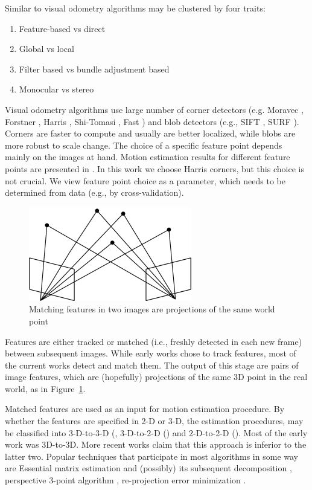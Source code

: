 \documentclass[MSc,beforeExam]{iitcsthesis}
\begin{document}
Similar to \cite{Persson2015} visual odometry algorithms may be
clustered by four traits:
\begin{enumerate}
\item Feature-based vs direct
\item Global vs local
\item Filter based vs bundle adjustment based
\item Monocular vs stereo
\end{enumerate}

Visual odometry algorithms use large number of corner detectors
(e.g. Moravec \cite{Moravec1980}, Forstner \cite{Forstner}, Harris
\cite{Harris1987}, Shi-Tomasi \cite{Shi1994}, Fast \cite{Rosten2006})
and blob detectors (e.g., SIFT \cite{Lowe2004}, SURF
\cite{Bay2006}). Corners are faster to compute and usually are better
localized, while blobs are more robust to scale change. The choice of
a specific feature point depends mainly on the images at hand.  Motion
estimation results for different feature points are presented in
\cite{Govender2009}. In this work we choose Harris \cite{Harris1987}
corners, but this choice is not crucial. We view feature point choice
as a parameter, which needs to be determined from data (e.g., by
cross-validation).

\begin{figure}[h]
  \centering
\includegraphics{5ptm2}
\caption{Matching features in two images are projections of the same
  world point}
\label{fig:5ptm}
\end{figure}

Features are either tracked \cite{Hedborg2009} or matched
\cite{Geiger2011} (i.e., freshly detected in each new frame) between
subsequent images. While early works chose to track features, most of
the current works detect and match them. The output of this stage are
pairs of image features, which are (hopefully) projections of the same
3D point in the real world, as in Figure~\ref{fig:5ptm}.

Matched features are used as an input for motion estimation procedure.
By whether the features are specified in 2-D or 3-D, the estimation
procedures, may be classified into 3-D-to-3-D (\cite{Milella2006},
3-D-to-2-D (\cite{Geiger2011}) and 2-D-to-2-D
(\cite{Nister2004}). Most of the early work was 3D-to-3D.  More recent
works \cite{Nister2004} claim that this approach is inferior to the
latter two. Popular techniques that participate in most algorithms in
some way are Essential matrix estimation and (possibly) its subsequent
decomposition \cite{Nister2004}, perspective 3-point algorithm
\cite{Kneip1991}, re-projection error minimization \cite{Geiger2011}.
\end{document}
